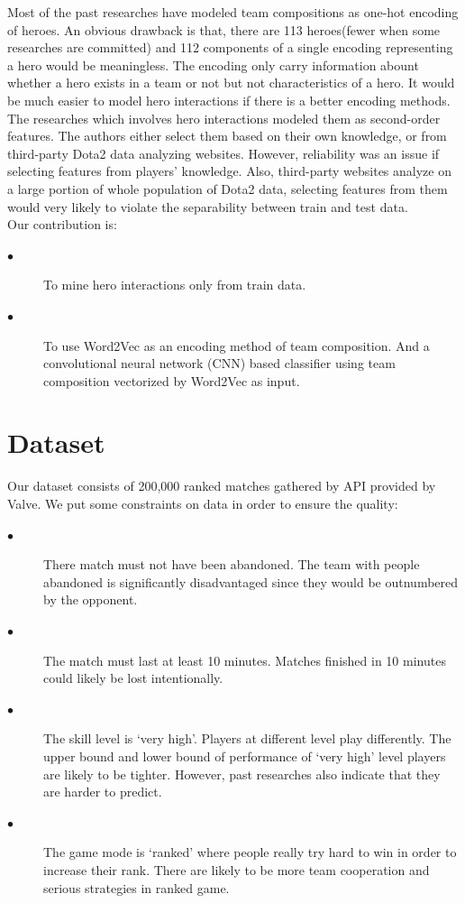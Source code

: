 \documentclass[12pt,openany,a4paper]{book}
\begin{document}
Most of the past researches have modeled team compositions as one-hot encoding of heroes. An obvious drawback is that, there are 113 heroes(fewer when some researches are committed) and 112 components of a single encoding representing a hero would be meaningless. The encoding only carry information abount whether a hero exists in a team or not but not characteristics of a hero. It would be much easier to model hero interactions if there is a better encoding methods.\\

The researches which involves hero interactions modeled them as second-order features. The authors either select them based on their own knowledge, or from third-party Dota2 data analyzing websites. However, reliability was an issue if selecting features from players' knowledge. Also, third-party websites analyze on a large portion of whole population of Dota2 data, selecting features from them would very likely to violate the separability between train and test data.\\

Our contribution is:
\begin{description}
  \item[$\bullet$ ] To mine hero interactions only from train data.
  \item[$\bullet$ ] To use Word2Vec as an encoding method of team composition. And a convolutional neural network (CNN) based classifier using team composition vectorized by Word2Vec as input.
\end{description}

\chapter{Dataset}
Our dataset consists of 200,000 ranked matches gathered by API provided by Valve. We put some constraints on data in order to ensure the quality:\\
\begin{description}
  \item[$\bullet$ ] There match must not have been abandoned. The team with people abandoned is significantly disadvantaged since they would be outnumbered by the opponent.
  \item[$\bullet$ ] The match must last at least 10 minutes. Matches finished in 10 minutes could likely be lost intentionally.
  \item[$\bullet$ ] The skill level is `very high'. Players at different level play differently. The upper bound and lower bound of performance of  `very high' level players are likely to be tighter. However, past researches also indicate that they are harder to predict.
  \item[$\bullet$ ] The game mode is `ranked' where people really try hard to win in order to increase their rank. There are likely to be more team cooperation and serious strategies in ranked game.
  \end{description}
\end{document}
